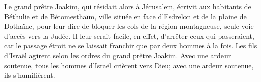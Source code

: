 Le grand prêtre Joakim, qui résidait alors à Jérusalem,
	écrivit aux habitants de Béthulie et de Bétomesthaïm,
	ville située en face d’Esdrelon et de la plaine de Dothaïne,
	pour leur dire de bloquer les cols de la région montagneuse,
	seule voie d’accès vers la Judée.
Il leur serait facile, en effet, d’arrêter ceux qui passeraient,
	car le passage étroit ne se laissait franchir que par deux hommes à la fois.
Les fils d’Israël agirent selon les ordres du grand prêtre Joakim.
Avec une ardeur soutenue, tous les hommes d’Israël crièrent vers Dieu;
	avec une ardeur soutenue, ils s’humilièrent.
